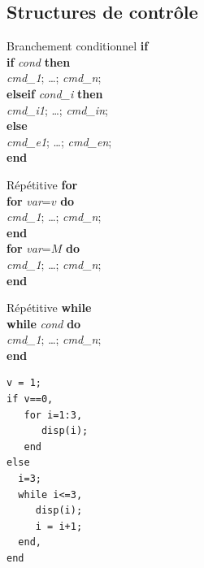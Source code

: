 \documentclass{article}
\begin{document}
\begin{multicols}{3}
\subsection*{Structures de contrôle}
\begin{description}
\item{Branchement conditionnel \textbf{if}}\\

\vspace{-3mm}
\hspace*{-7mm}\textbf{if} \textit{cond} \textbf{then}\\
\textit{cmd\_1}; \ldots; \textit{cmd\_n};\\
\hspace*{-7mm}\textbf{elseif} \textit{cond\_i} \textbf{then}\\
\textit{cmd\_i1}; \ldots; \textit{cmd\_in};\\
\hspace*{-7mm}\textbf{else}\\
\textit{cmd\_e1}; \ldots; \textit{cmd\_en};\\
\hspace*{-7mm}\textbf{end}\\

\item{Répétitive \textbf{for}}\\

\vspace{-3mm}
\hspace*{-7mm}\textbf{for} \textit{var}=$v$ \textbf{do}\\
\textit{cmd\_1}; \ldots; \textit{cmd\_n};\\
\hspace*{-7mm}\textbf{end}\\

\vspace{-3mm}
\hspace*{-7mm}\textbf{for} \textit{var}=$M$ \textbf{do}\\
\textit{cmd\_1}; \ldots; \textit{cmd\_n};\\
\hspace*{-7mm}\textbf{end}\\

\item{Répétitive \textbf{while}}\\

\vspace{-3mm}
\hspace*{-7mm}\textbf{while} \textit{cond} \textbf{do}\\
\textit{cmd\_1}; \ldots; \textit{cmd\_n};\\
\hspace*{-7mm}\textbf{end}
\end{description}
\begin{verbatim}
v = 1;
if v==0,
   for i=1:3,
      disp(i);
   end
else
  i=3;
  while i<=3,
     disp(i);
     i = i+1;
  end, 
end    
\end{verbatim}

\end{multicols}
\end{document}
